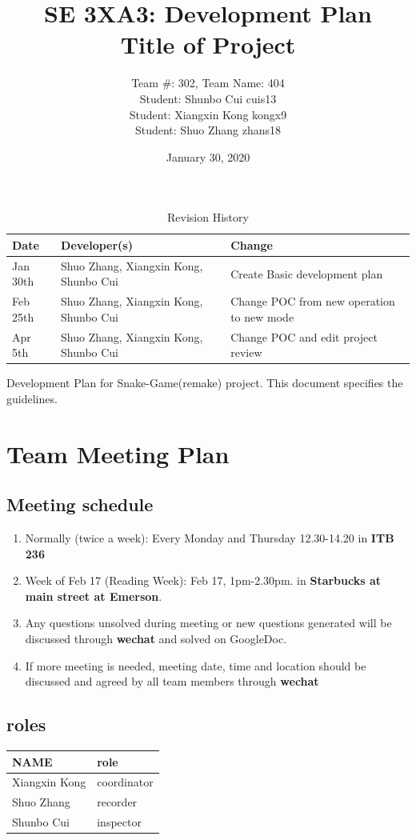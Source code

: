 \documentclass{article}
\title{SE 3XA3: Development Plan\\Title of Project}
\author{Team \#: 302, Team Name: 404
		\\ Student: Shunbo Cui	cuis13
		\\ Student: Xiangxin Kong	kongx9
		\\ Student: Shuo Zhang	zhans18
}
\date{January 30, 2020}
\begin{document}
\begin{table}[hp]
\caption{Revision History} \label{TblRevisionHistory}
\begin{tabularx}{\textwidth}{llX}
\toprule
\textbf{Date} & \textbf{Developer(s)} & \textbf{Change}\\
\midrule
Jan 30th & Shuo Zhang, Xiangxin Kong, Shunbo Cui & Create Basic development plan\\
Feb 25th & Shuo Zhang, Xiangxin Kong, Shunbo Cui & Change POC from new operation to new mode\\ 
Apr 5th & Shuo Zhang, Xiangxin Kong, Shunbo Cui & Change POC and edit project review\\
\bottomrule
\end{tabularx}
\end{table}

\newpage

\maketitle

Development Plan for Snake-Game(remake) project. This document specifies the guidelines.

\section{Team Meeting Plan}
\subsection{Meeting schedule}
\begin{enumerate}
    \item Normally (twice a week): Every Monday and Thursday  12.30-14.20 in \textbf{ITB 236}
    \item Week of Feb 17 (Reading Week): Feb 17, 1pm-2.30pm. in \textbf{Starbucks at main street at Emerson}.
	\item Any questions unsolved during meeting or new questions generated will be discussed through \textbf{wechat} and solved on GoogleDoc.
    \item If more meeting is needed, meeting date, time and location should be discussed and agreed by all team members through \textbf{wechat}
\end{enumerate}
\subsection{roles}

    \begin{tabular}{ |l|l| }
        \toprule
        \textbf{NAME} & \textbf{role} \\
        \midrule
        Xiangxin Kong & coordinator \\
        \midrule
        Shuo Zhang & recorder \\
        \midrule
        Shunbo Cui & inspector \\
        \bottomrule
    \end{tabular}
\end{document}
